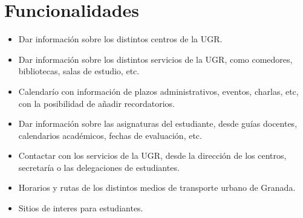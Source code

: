 \section{Funcionalidades}

\begin{itemize}
	\item Dar información sobre los distintos centros de la UGR.
	\item Dar información sobre los distintos servicios de la UGR, como comedores, bibliotecas, salas de estudio, etc.
	\item Calendarío con información de plazos administrativos, eventos, charlas, etc, con la posibilidad de añadir recordatorios.
	\item Dar información sobre las asignaturas del estudiante, desde guías docentes, calendarios académicos, fechas de evaluación, etc.
	\item Contactar con los servicios de la UGR, desde la dirección de los centros, secretaría o las delegaciones de estudiantes.
	\item Horarios y rutas de los distintos medios de transporte urbano de Granada.
	\item Sitios de interes para estudiantes.
\end{itemize}
